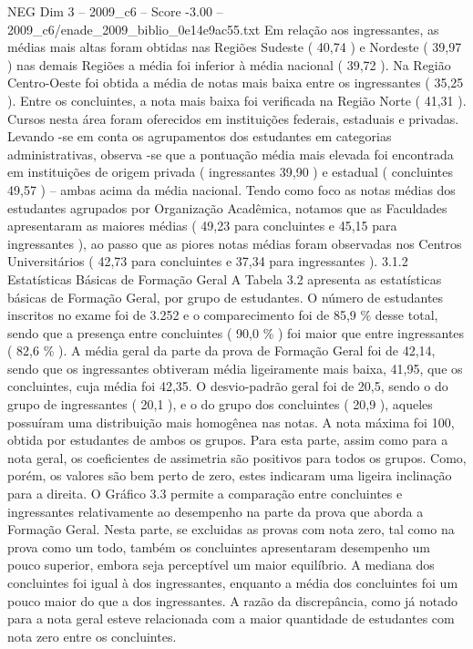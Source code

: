 \begin{textsample}{NEG Dim 3 – 2009\_c6 – Score -3.00 – 2009\_c6/enade\_2009\_biblio\_0e14e9ac55.txt}
Em relação aos ingressantes, as médias mais altas foram obtidas nas Regiões Sudeste ( 40,74 ) e Nordeste ( 39,97 ) nas demais Regiões a média foi inferior à média nacional ( 39,72 ).
Na Região Centro-Oeste foi obtida a média de notas mais baixa entre os ingressantes ( 35,25 ).
Entre os concluintes, a nota mais baixa foi verificada na Região Norte ( 41,31 ).
Cursos nesta área foram oferecidos em instituições federais, estaduais e privadas.
Levando -se em conta os agrupamentos dos estudantes em categorias administrativas, observa -se que a pontuação média mais elevada foi encontrada em instituições de origem privada ( ingressantes 39,90 ) e estadual ( concluintes 49,57 ) – ambas acima da média nacional.
Tendo como foco as notas médias dos estudantes agrupados por Organização Acadêmica, notamos que as Faculdades apresentaram as maiores médias ( 49,23 para concluintes e 45,15 para ingressantes ), ao passo que as piores notas médias foram observadas nos Centros Universitários ( 42,73 para concluintes e 37,34 para ingressantes ). 3.1.2 Estatísticas Básicas de Formação Geral A Tabela 3.2 apresenta as estatísticas básicas de Formação Geral, por grupo de estudantes.
O número de estudantes inscritos no exame foi de 3.252 e o comparecimento foi de 85,9 \% desse total, sendo que a presença entre concluintes ( 90,0 \% ) foi maior que entre ingressantes ( 82,6 \% ).
A média geral da parte da prova de Formação Geral foi de 42,14, sendo que os ingressantes obtiveram média ligeiramente mais baixa, 41,95, que os concluintes, cuja média foi 42,35.
O desvio-padrão geral foi de 20,5, sendo o do grupo de ingressantes ( 20,1 ), e o do grupo dos concluintes ( 20,9 ), aqueles possuíram uma distribuição mais homogênea nas notas.
A nota máxima foi 100, obtida por estudantes de ambos os grupos.
Para esta parte, assim como para a nota geral, os coeficientes de assimetria são positivos para todos os grupos.
Como, porém, os valores são bem perto de zero, estes indicaram uma ligeira inclinação para a direita.
O Gráfico 3.3 permite a comparação entre concluintes e ingressantes relativamente ao desempenho na parte da prova que aborda a Formação Geral.
Nesta parte, se excluidas as provas com nota zero, tal como na prova como um todo, também os concluintes apresentaram desempenho um pouco superior, embora seja perceptível um maior equilíbrio.
A mediana dos concluintes foi igual à dos ingressantes, enquanto a média dos concluintes foi um pouco maior do que a dos ingressantes.
A razão da discrepância, como já notado para a nota geral esteve relacionada com a maior quantidade de estudantes com nota zero entre os concluintes.

\end{textsample}
